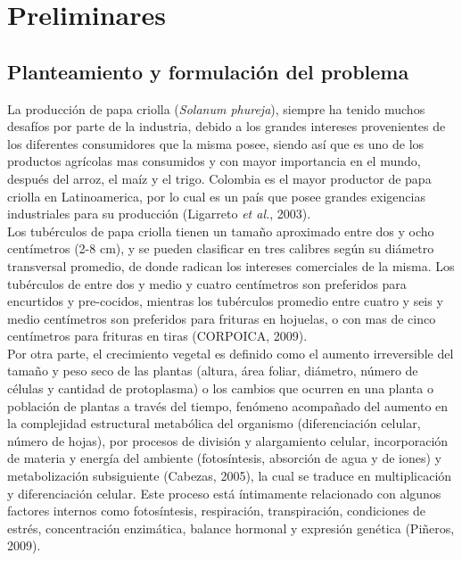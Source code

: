 \chapter{Preliminares}

\section{Planteamiento y formulación del problema}

La producción de papa criolla (\textit{Solanum phureja}), siempre ha tenido muchos desafíos por parte de la industria, debido a los grandes intereses provenientes de los diferentes consumidores que la misma posee, siendo así que es uno de los productos agr\'icolas mas consumidos y con mayor importancia en el mundo, después del arroz, el ma\'iz y el trigo. Colombia es el mayor productor de papa criolla en Latinoamerica, por lo cual es un pa\'is que posee grandes exigencias industriales para su producción (Ligarreto \textit{et al.}, 2003).\\

Los tubérculos de papa criolla tienen un tamaño aproximado entre dos y ocho centímetros (2-8 cm), y se pueden clasificar en tres calibres según su diámetro transversal promedio,  de donde radican los intereses comerciales de la misma. Los tubérculos de entre dos y medio y cuatro centímetros son preferidos para encurtidos y pre-cocidos, mientras los tubérculos promedio entre cuatro y seis y medio centímetros son preferidos para frituras en hojuelas, o con mas de cinco centímetros para frituras en tiras (CORPOICA, 2009).\\

Por otra parte, el crecimiento vegetal es definido  como el aumento irreversible del tamaño y peso seco de las plantas (altura, área foliar, diámetro, número de células y cantidad de protoplasma) o los cambios que ocurren en una planta o población de plantas a través del tiempo, fenómeno acompañado del aumento en la complejidad estructural metabólica del organismo (diferenciación celular, número de hojas), por procesos de división y alargamiento celular, incorporación de materia y energía del ambiente (fotosíntesis, absorción de agua y de iones) y metabolización subsiguiente (Cabezas, 2005), la cual se traduce en multiplicación y diferenciación celular. Este proceso está íntimamente relacionado con algunos factores internos como fotosíntesis, respiración, transpiración, condiciones de estrés, concentración enzimática, balance hormonal y expresión genética (Piñeros, 2009).\\

